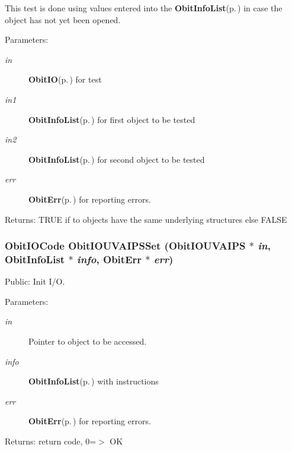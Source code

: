 This test is done using values entered into the {\bf Obit\-Info\-List}{\rm (p.\,\pageref{structObitInfoList})} in case the object has not yet been opened. \begin{Desc}
\item[Parameters:]
\begin{description}
\item[{\em in}]{\bf Obit\-IO}{\rm (p.\,\pageref{structObitIO})} for test \item[{\em in1}]{\bf Obit\-Info\-List}{\rm (p.\,\pageref{structObitInfoList})} for first object to be tested \item[{\em in2}]{\bf Obit\-Info\-List}{\rm (p.\,\pageref{structObitInfoList})} for second object to be tested \item[{\em err}]{\bf Obit\-Err}{\rm (p.\,\pageref{structObitErr})} for reporting errors. \end{description}
\end{Desc}
\begin{Desc}
\item[Returns:]TRUE if to objects have the same underlying structures else FALSE \end{Desc}
\subsubsection{\setlength{\rightskip}{0pt plus 5cm}Obit\-IOCode Obit\-IOUVAIPSSet ({\bf Obit\-IOUVAIPS} $\ast$ {\em in}, {\bf Obit\-Info\-List} $\ast$ {\em info}, {\bf Obit\-Err} $\ast$ {\em err})}\label{ObitIOUVAIPS_8c_a18}


Public: Init I/O. 

\begin{Desc}
\item[Parameters:]
\begin{description}
\item[{\em in}]Pointer to object to be accessed. \item[{\em info}]{\bf Obit\-Info\-List}{\rm (p.\,\pageref{structObitInfoList})} with instructions \item[{\em err}]{\bf Obit\-Err}{\rm (p.\,\pageref{structObitErr})} for reporting errors. \end{description}
\end{Desc}
\begin{Desc}
\item[Returns:]return code, 0=$>$ OK \end{Desc}
